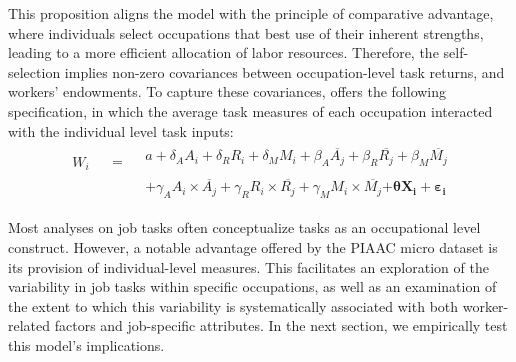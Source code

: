 \begin{onehalfspace}
This proposition aligns the model with the principle of comparative
advantage, where individuals select occupations that best use of their
inherent strengths, leading to a more efficient allocation of labor
resources. Therefore, the self-selection implies non-zero covariances
between occupation-level task returns, and workers' endowments. To
capture these covariances, \citet{2013Autora} offers the following
specification, in which the average task measures of each occupation
interacted with the individual level task inputs: 
\begin{eqnarray}
\begin{array}{c}
W_{i}\\
\\
\\
\end{array} & \begin{array}{c}
=\\
\\
\\
\end{array} & \begin{array}{c}
a+\delta_{A}A_{i}+\delta_{R}R_{i}+\delta_{M}M_{i}+\beta_{A}\overline{A_{j}}+\beta_{R}\overline{R_{j}}+\beta_{M}\overline{M_{j}}\\
\\
+\gamma_{A}A_{i}\times\overline{A_{j}}+\gamma_{R}R_{i}\times\overline{R_{j}}+\gamma_{M}M_{i}\times\overline{M_{j}}\mathbf{+\theta X_{i}+\varepsilon_{i}}
\end{array}\label{eq:aheq10}
\end{eqnarray}

Most analyses on job tasks often conceptualize tasks as an occupational
level construct. However, a notable advantage offered by the PIAAC
\citep{2016} micro dataset is its provision of individual-level measures.
This facilitates an exploration of the variability in job tasks within
specific occupations, as well as an examination of the extent to which
this variability is systematically associated with both worker-related
factors and job-specific attributes. In the next section, we empirically
test this model's implications.
\end{onehalfspace}

\newpage{}
